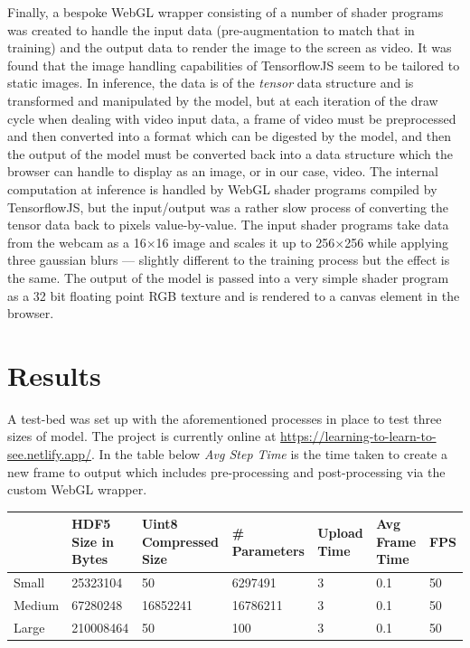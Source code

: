 \documentclass[a4paper]{article}
\begin{document}
Finally, a bespoke WebGL wrapper consisting of a number of shader programs was created to handle the input data (pre-augmentation to match that in training) and the output data to render the image to the screen as video. It was found that the image handling capabilities of TensorflowJS seem to be tailored to static images. In inference, the data is of the \textit{tensor} data structure and is transformed and manipulated by the model, but at each iteration of the draw cycle when dealing with video input data, a frame of video must be preprocessed and then converted into a format which can be digested by the model, and then the output of the model must be converted back into a data structure which the browser can handle to display as an image, or in our case, video. The internal computation at inference is handled by WebGL shader programs compiled by TensorflowJS, but the input/output was a rather slow process of converting the tensor data back to pixels value-by-value. The input shader programs take data from the webcam as a 16$\times$16 image and scales it up to 256$\times$256 while applying three gaussian blurs --- slightly different to the training process but the effect is the same. The output of the model is passed into a very simple shader program as a 32 bit floating point RGB texture and is rendered to a canvas element in the browser.

\section{Results}
A test-bed was set up with the aforementioned processes in place to test three sizes of model. The project is currently online at \url{https://learning-to-learn-to-see.netlify.app/}. In the table below \textit{Avg Step Time} is the time taken to create a new frame to output which includes pre-processing and post-processing via the custom WebGL wrapper.

\begin{small}
	\begin{center}
		\begin{tabular}{p{1.5cm} p{1.5cm} p{1.5cm} p{1.5cm} p{1.5cm} p{1.5cm} p{1cm}}
			       & HDF5 Size in Bytes & Uint8 Compressed Size & \# Parameters & Upload Time & Avg Frame Time & FPS \\
			\hline
			Small  & 25323104           & 50                    & 6297491       & 3           & 0.1            & 50  \\
			Medium & 67280248           & 16852241              & 16786211      & 3           & 0.1            & 50  \\
			Large  & 210008464          & 50                    & 100           & 3           & 0.1            & 50  \\
			\hline
		\end{tabular}
	\end{center}
\end{small}
\end{document}
